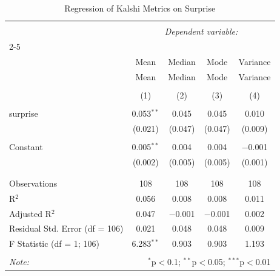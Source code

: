 
\begin{table}[!htbp] \centering 
  \caption{Regression of Kalshi Metrics on Surprise} 
  \label{} 
\begin{tabular}{@{\extracolsep{5pt}}lcccc} 
\\[-1.8ex]\hline 
\hline \\[-1.8ex] 
 & \multicolumn{4}{c}{\textit{Dependent variable:}} \\ 
\cline{2-5} 
\\[-1.8ex] & Mean & Median & Mode & Variance \\ 
 & Mean & Median & Mode & Variance \\ 
\\[-1.8ex] & (1) & (2) & (3) & (4)\\ 
\hline \\[-1.8ex] 
 surprise & 0.053$^{**}$ & 0.045 & 0.045 & 0.010 \\ 
  & (0.021) & (0.047) & (0.047) & (0.009) \\ 
  & & & & \\ 
 Constant & 0.005$^{**}$ & 0.004 & 0.004 & $-$0.001 \\ 
  & (0.002) & (0.005) & (0.005) & (0.001) \\ 
  & & & & \\ 
\hline \\[-1.8ex] 
Observations & 108 & 108 & 108 & 108 \\ 
R$^{2}$ & 0.056 & 0.008 & 0.008 & 0.011 \\ 
Adjusted R$^{2}$ & 0.047 & $-$0.001 & $-$0.001 & 0.002 \\ 
Residual Std. Error (df = 106) & 0.021 & 0.048 & 0.048 & 0.009 \\ 
F Statistic (df = 1; 106) & 6.283$^{**}$ & 0.903 & 0.903 & 1.193 \\ 
\hline 
\hline \\[-1.8ex] 
\textit{Note:}  & \multicolumn{4}{r}{$^{*}$p$<$0.1; $^{**}$p$<$0.05; $^{***}$p$<$0.01} \\ 
\end{tabular} 
\end{table} 
